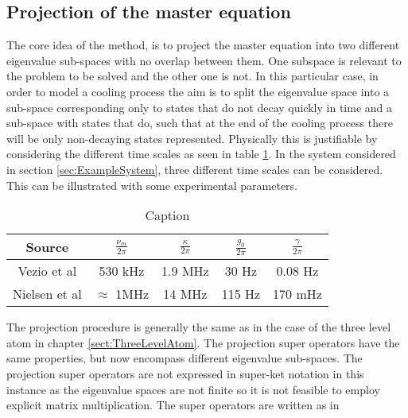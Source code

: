 \documentclass[12pt]{article}
\begin{document}
\subsection{Projection of the master equation}

The core idea of the method, is to project the master equation into two different eigenvalue sub-spaces with no overlap between them. One subspace is relevant to the problem to be solved and the other one is not. In this particular case, in order to model a cooling process the aim is to split the eigenvalue space into a sub-space corresponding only to states that do not decay quickly in time and a sub-space with states that do, such that at the end of the cooling process there will be only non-decaying states represented. Physically this is justifiable by considering the different time scales as seen in table \ref{tab:experimental_parameter_table}. In the system considered in section \ref{sec:ExampleSystem}, three different time scales can be considered. This can be illustrated with some experimental parameters.

\begin{table}[]
    \centering
    \begin{tabular}{|c|c|c|c|c|}
        \hline
        Source & $\frac{\nu_m}{2\pi}$ & $\frac{\kappa}{2\pi}$ & $\frac{g_0}{2\pi}$&  $\frac{\gamma}{2\pi}$  \\
        \hline\hline
        Vezio et al \cite{VezioOMExperiment2020} & 530 kHz & 1.9 MHz &  30 Hz & 0.08 Hz \\
        \hline
        Nielsen et al \cite{NielsenMultimodeOptomechanicalMembrane2017} & $\approx$ 1MHz & 14 MHz & 115 Hz & 170 mHz\\
        \hline
    \end{tabular}
    \caption{Caption}
    \label{tab:experimental_parameter_table}
\end{table}

The projection procedure is generally the same as in the case of the three level atom in chapter \ref{sect:ThreeLevelAtom}. The projection super operators have the same properties, but now encompass different eigenvalue sub-spaces. The projection super operators are not expressed in super-ket notation in this instance as the eigenvalue spaces are not finite so it is not feasible to employ explicit matrix multiplication. The super operators are written as in \cite{YanesOptomechanicalCooling2020}
\end{document}
